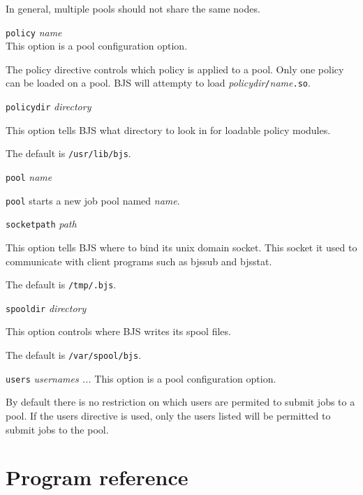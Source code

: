 \documentclass[oneside]{book}
\begin{document}
\begin{description}
In general, multiple pools should not share the same nodes.

\item{\texttt{policy} \emph{name}}\\
This option is a pool configuration option.

The policy directive controls which policy is applied to a pool.  Only
one policy can be loaded on a pool.  BJS will attempty to load
\emph{policydir}\texttt{/}\emph{name}\texttt{.so}.

\item{\texttt{policydir} \emph{directory}}

This option tells BJS what directory to look in for loadable policy
modules.

The default is \texttt{/usr/lib/bjs}.

\item{\texttt{pool} \emph{name}}

\texttt{pool} starts a new job pool named \emph{name}.

\item{\texttt{socketpath} \emph{path}}

This option tells BJS where to bind its unix domain socket.  This
socket it used to communicate with client programs such as bjssub and
bjsstat.

The default is \texttt{/tmp/.bjs}.

\item{\texttt{spooldir} \emph{directory}}

This option controls where BJS writes its spool files.

The default is \texttt{/var/spool/bjs}.

\item{\texttt{users} \emph{usernames ... }}
This option is a pool configuration option.

By default there is no restriction on which users are permited to
submit jobs to a pool.  If the users directive is used, only the users
listed will be permitted to submit jobs to the pool.
\end{description}



\chapter{Program reference}  %
\end{document}
